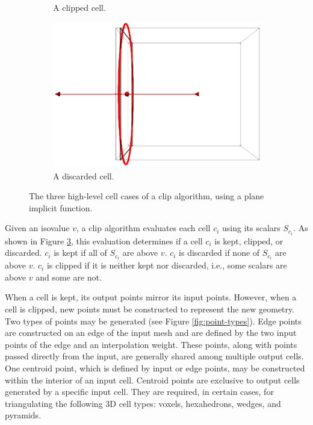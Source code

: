\documentclass{egpubl}
\begin{document}
\begin{figure}[h]
\begin{subfigure}[t]{0.29\linewidth}
    \caption{A clipped cell.}
    \label{fig:clipped-cell}
  \end{subfigure}
  \begin{subfigure}[t]{0.29\linewidth}
    \centering
    \includegraphics[width=\linewidth]{Figures/Discarded-Cell.png}
    \caption{A discarded cell.}
    \label{fig:discarded-cell}
  \end{subfigure}
  \caption{The three high-level cell cases of a clip algorithm, using a plane implicit function.}
  \label{fig:cell-cases}
\end{figure}

Given an isovalue $v$, a clip algorithm evaluates each cell $c_i$ using its scalars $S_{c_i}$. As shown in Figure \ref{fig:cell-cases}, this evaluation determines if a cell $c_i$ is kept, clipped, or discarded.
$c_i$ is kept if
all of $S_{c_i}$ are above $v$.
$c_i$ is discarded if
none of $S_{c_i}$ are above $v$.
$c_i$ is clipped if
it is neither kept nor discarded, i.e., some scalars are above $v$ and some are not.

When a cell is kept, its output points mirror its input points. However, when a cell is clipped, new points must be constructed to represent the new geometry. Two types of points may be generated (see Figure \ref{fig:point-types}). Edge points are constructed on an edge of the input mesh and are defined by the two input points of the edge and an interpolation weight. These points, along with points passed directly from the input, are generally shared among multiple output cells. One centroid point, which is defined by input or edge points, may be constructed within the interior of an input cell. Centroid points are exclusive to output cells generated by a specific input cell. They are required, in certain cases, for triangulating the following 3D cell types: voxels, hexahedrons, wedges, and pyramids.
\end{document}
